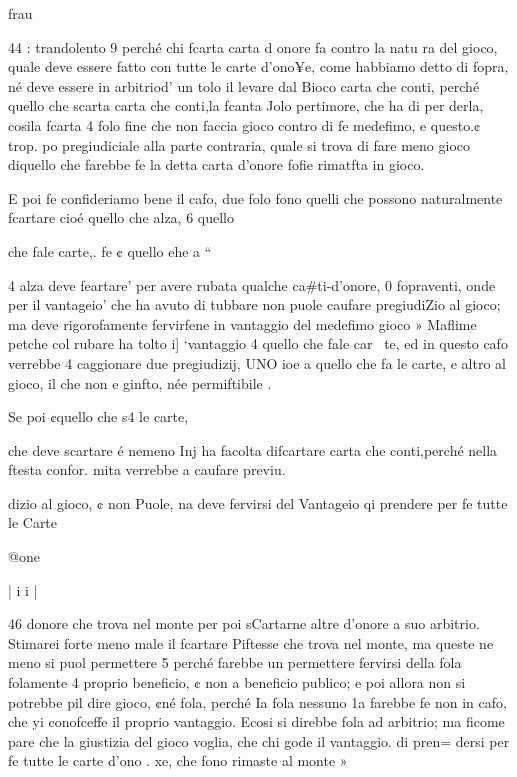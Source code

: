 \documentclass[12pt,a6paper]{article}
\begin{document}
frau
 
 

 

 

 

 

 

44 :
trandolento 9 perché chi fcarta
carta d onore fa contro la natu
ra del gioco, quale deve essere
fatto con tutte le carte d’ono¥e, come habbiamo detto di fopra, né deve essere in arbitriod’
un tolo il levare dal Bioco carta
che conti, perché quello che
scarta carta che conti,la fcanta
Jolo pertimore, che ha di per
derla, cosila fcarta 4 folo fine
che non faccia gioco contro di
fe medefimo, e questo.¢ trop.
po pregiudiciale alla parte contraria, quale si trova di fare meno gioco diquello che farebbe
fe la detta carta d’onore fofie
rimatfta in gioco.

E poi fe confideriamo bene
il cafo, due folo fono quelli che
possono naturalmente fcartare
cioé quello che alza, 6 quello

che fale carte,. fe ¢ quello ehe
a “
 

4
alza deve feartare’ per avere
rubata qualche ca#ti-d’onore,
0 fopraventi, onde per il vantageio’ che ha avuto di tubbare non puole caufare pregiudiZio al gioco; ma deve rigorofamente fervirfene in vantaggio
del medefimo gioco » Maflime
petche col rubare ha tolto i]
‘vantaggio 4 quello che fale car~
te, ed in questo cafo verrebbe
4 caggionare due pregiudizij,
UNO ioe a quello che fa le carte, e altro al gioco, il che non
e ginfto, née permiftibile .

Se poi ¢quello che s4 le carte,

che deve scartare é nemeno Inj
ha facolta difcartare carta che
conti,perché nella ftesta confor.
mita verrebbe a caufare previu.

dizio al gioco, ¢ non Puole, na
deve fervirsi del Vantageio qi
prendere per fe tutte le Carte

@one~

 
 

 

 

 

|
i
i
|

46
donore che trova nel monte
per poi sCartarne altre d’onore
a suo arbitrio. Stimarei forte
meno male il fcartare Piftesse
che trova nel monte, ma queste
ne meno si puol permettere 5
perché farebbe un permettere
fervirsi della fola folamente 4
proprio beneficio, ¢ non a beneficio publico; e poi allora non
si potrebbe pil dire gioco, ¢né
fola, perché Ia fola nessuno 1a
farebbe fe non in cafo, che yi
conofceffe il proprio vantaggio. Ecosi si direbbe fola ad
arbitrio; ma ficome pare che la
giustizia del gioco voglia, che
chi gode il vantaggio. di pren=
dersi per fe tutte le carte d’ono
. xe, che fono rimaste al monte »
\end{document}
